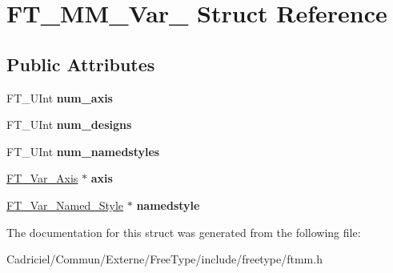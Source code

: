 \hypertarget{struct_f_t___m_m___var__}{}\section{F\+T\+\_\+\+M\+M\+\_\+\+Var\+\_\+ Struct Reference}
\label{struct_f_t___m_m___var__}
\subsection*{Public Attributes}
\begin{DoxyCompactItemize}
\item 
F\+T\+\_\+\+U\+Int {\bfseries num\+\_\+axis}\hypertarget{struct_f_t___m_m___var___acd32d4eb128f6fd9f6fde7da4c7b99bf}{}\label{struct_f_t___m_m___var___acd32d4eb128f6fd9f6fde7da4c7b99bf}

\item 
F\+T\+\_\+\+U\+Int {\bfseries num\+\_\+designs}\hypertarget{struct_f_t___m_m___var___a5109a6a20626d90ed44cd64363d29e92}{}\label{struct_f_t___m_m___var___a5109a6a20626d90ed44cd64363d29e92}

\item 
F\+T\+\_\+\+U\+Int {\bfseries num\+\_\+namedstyles}\hypertarget{struct_f_t___m_m___var___ac54bdd53447f4967b5d3b1a341a4bdff}{}\label{struct_f_t___m_m___var___ac54bdd53447f4967b5d3b1a341a4bdff}

\item 
\hyperlink{struct_f_t___var___axis__}{F\+T\+\_\+\+Var\+\_\+\+Axis} $\ast$ {\bfseries axis}\hypertarget{struct_f_t___m_m___var___a19cc7772e057dad1c4acd6e744328466}{}\label{struct_f_t___m_m___var___a19cc7772e057dad1c4acd6e744328466}

\item 
\hyperlink{struct_f_t___var___named___style__}{F\+T\+\_\+\+Var\+\_\+\+Named\+\_\+\+Style} $\ast$ {\bfseries namedstyle}\hypertarget{struct_f_t___m_m___var___acda1ec5211250ddc06ec090f695adabf}{}\label{struct_f_t___m_m___var___acda1ec5211250ddc06ec090f695adabf}

\end{DoxyCompactItemize}


The documentation for this struct was generated from the following file\+:\begin{DoxyCompactItemize}
\item 
Cadriciel/\+Commun/\+Externe/\+Free\+Type/include/freetype/ftmm.\+h\end{DoxyCompactItemize}
